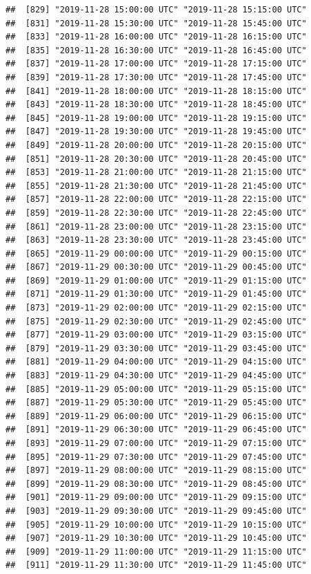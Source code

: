 \documentclass{article}\usepackage[]{graphicx}\usepackage[]{color}
\makeatletter
\newenvironment{kframe}{%
 \def\at@end@of@kframe{}%
 \ifinner\ifhmode%
  \def\at@end@of@kframe{\end{minipage}}%
  \begin{minipage}{\columnwidth}%
 \fi\fi%
 \def\FrameCommand##1{\hskip\@totalleftmargin \hskip-\fboxsep
 \colorbox{shadecolor}{##1}\hskip-\fboxsep
     \hskip-\linewidth \hskip-\@totalleftmargin \hskip\columnwidth}%
 \MakeFramed {\advance\hsize-\width
   \@totalleftmargin\z@ \linewidth\hsize
   \@setminipage}}%
 {\par\unskip\endMakeFramed%
 \at@end@of@kframe}
\newenvironment{knitrout}{}{} %
\makeatother
\begin{document}
\begin{knitrout}
\begin{kframe}
\begin{verbatim}
##  [829] "2019-11-28 15:00:00 UTC" "2019-11-28 15:15:00 UTC"
##  [831] "2019-11-28 15:30:00 UTC" "2019-11-28 15:45:00 UTC"
##  [833] "2019-11-28 16:00:00 UTC" "2019-11-28 16:15:00 UTC"
##  [835] "2019-11-28 16:30:00 UTC" "2019-11-28 16:45:00 UTC"
##  [837] "2019-11-28 17:00:00 UTC" "2019-11-28 17:15:00 UTC"
##  [839] "2019-11-28 17:30:00 UTC" "2019-11-28 17:45:00 UTC"
##  [841] "2019-11-28 18:00:00 UTC" "2019-11-28 18:15:00 UTC"
##  [843] "2019-11-28 18:30:00 UTC" "2019-11-28 18:45:00 UTC"
##  [845] "2019-11-28 19:00:00 UTC" "2019-11-28 19:15:00 UTC"
##  [847] "2019-11-28 19:30:00 UTC" "2019-11-28 19:45:00 UTC"
##  [849] "2019-11-28 20:00:00 UTC" "2019-11-28 20:15:00 UTC"
##  [851] "2019-11-28 20:30:00 UTC" "2019-11-28 20:45:00 UTC"
##  [853] "2019-11-28 21:00:00 UTC" "2019-11-28 21:15:00 UTC"
##  [855] "2019-11-28 21:30:00 UTC" "2019-11-28 21:45:00 UTC"
##  [857] "2019-11-28 22:00:00 UTC" "2019-11-28 22:15:00 UTC"
##  [859] "2019-11-28 22:30:00 UTC" "2019-11-28 22:45:00 UTC"
##  [861] "2019-11-28 23:00:00 UTC" "2019-11-28 23:15:00 UTC"
##  [863] "2019-11-28 23:30:00 UTC" "2019-11-28 23:45:00 UTC"
##  [865] "2019-11-29 00:00:00 UTC" "2019-11-29 00:15:00 UTC"
##  [867] "2019-11-29 00:30:00 UTC" "2019-11-29 00:45:00 UTC"
##  [869] "2019-11-29 01:00:00 UTC" "2019-11-29 01:15:00 UTC"
##  [871] "2019-11-29 01:30:00 UTC" "2019-11-29 01:45:00 UTC"
##  [873] "2019-11-29 02:00:00 UTC" "2019-11-29 02:15:00 UTC"
##  [875] "2019-11-29 02:30:00 UTC" "2019-11-29 02:45:00 UTC"
##  [877] "2019-11-29 03:00:00 UTC" "2019-11-29 03:15:00 UTC"
##  [879] "2019-11-29 03:30:00 UTC" "2019-11-29 03:45:00 UTC"
##  [881] "2019-11-29 04:00:00 UTC" "2019-11-29 04:15:00 UTC"
##  [883] "2019-11-29 04:30:00 UTC" "2019-11-29 04:45:00 UTC"
##  [885] "2019-11-29 05:00:00 UTC" "2019-11-29 05:15:00 UTC"
##  [887] "2019-11-29 05:30:00 UTC" "2019-11-29 05:45:00 UTC"
##  [889] "2019-11-29 06:00:00 UTC" "2019-11-29 06:15:00 UTC"
##  [891] "2019-11-29 06:30:00 UTC" "2019-11-29 06:45:00 UTC"
##  [893] "2019-11-29 07:00:00 UTC" "2019-11-29 07:15:00 UTC"
##  [895] "2019-11-29 07:30:00 UTC" "2019-11-29 07:45:00 UTC"
##  [897] "2019-11-29 08:00:00 UTC" "2019-11-29 08:15:00 UTC"
##  [899] "2019-11-29 08:30:00 UTC" "2019-11-29 08:45:00 UTC"
##  [901] "2019-11-29 09:00:00 UTC" "2019-11-29 09:15:00 UTC"
##  [903] "2019-11-29 09:30:00 UTC" "2019-11-29 09:45:00 UTC"
##  [905] "2019-11-29 10:00:00 UTC" "2019-11-29 10:15:00 UTC"
##  [907] "2019-11-29 10:30:00 UTC" "2019-11-29 10:45:00 UTC"
##  [909] "2019-11-29 11:00:00 UTC" "2019-11-29 11:15:00 UTC"
##  [911] "2019-11-29 11:30:00 UTC" "2019-11-29 11:45:00 UTC"

\end{verbatim}
\end{kframe}
\end{knitrout}
\end{document}
